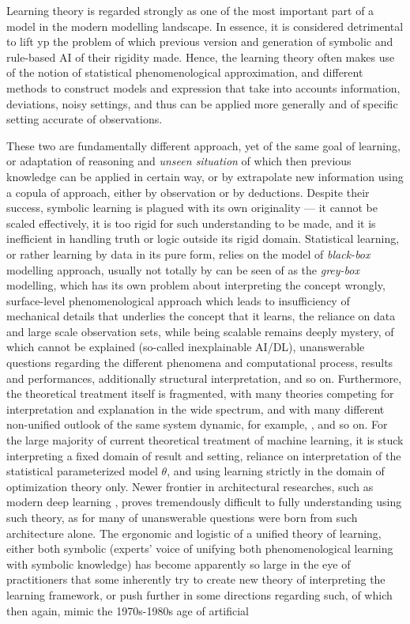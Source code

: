 Learning theory is regarded strongly as one of the most important part of a model in the modern modelling landscape. In essence, it is considered detrimental to lift yp the problem of which previous version and generation of symbolic and rule-based AI of their rigidity made. Hence, the learning theory often makes use of the notion of statistical phenomenological approximation, and different methods to construct models and expression that take into accounts information, deviations, noisy settings, and thus can be applied more generally and of specific setting accurate of observations. 

These two are fundamentally different approach, yet of the same goal of learning, or adaptation of reasoning and \textit{unseen situation} of which then previous knowledge can be applied in certain way, or by extrapolate new information using a copula of approach, either by observation or by deductions. Despite their success, symbolic learning is plagued with its own originality --- it cannot be scaled effectively, it is too rigid for such understanding to be made, and it is inefficient in handling truth or logic outside its rigid domain. Statistical learning, or rather learning by data in its pure form, relies on the model of \textit{black-box} modelling approach, usually not totally by can be seen of as the \textit{grey-box} modelling, which has its own problem about interpreting the concept wrongly, surface-level phenomenological approach which leads to insufficiency of mechanical details that underlies the concept that it learns, the reliance on data and large scale observation sets, while being scalable remains deeply mystery, of which cannot be explained (so-called inexplainable AI/DL), unanswerable questions regarding the different phenomena and computational process, results and performances, additionally structural interpretation, and so on. Furthermore, the theoretical treatment itself is fragmented, with many theories competing for interpretation and explanation in the wide spectrum, and with many different non-unified outlook of the same system dynamic, for example, \cite{mcallester1999some,alquier2008pac,haussler1996rigorous,jeon2025informationtheoreticfoundationsmachinelearning,abreu2025topologicalmachinelearningunreduced}, and so on. For the large majority of current theoretical treatment of machine learning, it is stuck interpreting a fixed domain of result and setting, reliance on interpretation of the statistical parameterized model $\theta$, and using learning strictly in the domain of optimization theory only. Newer frontier in architectural researches, such as modern deep learning \cite{marcus2018deep,goodfellow2016deep,10.5555/2721661}, proves tremendously difficult to fully understanding using such theory, as for many of unanswerable questions were born from such architecture alone. The ergonomic and logistic of a unified theory of learning, either both symbolic (experts' voice of unifying both phenomenological learning with symbolic knowledge) has become apparently so large in the eye of practitioners that some inherently try to create new theory of interpreting the learning framework, or push further in some directions regarding such, of which then again, mimic the 1970s-1980s age of artificial 